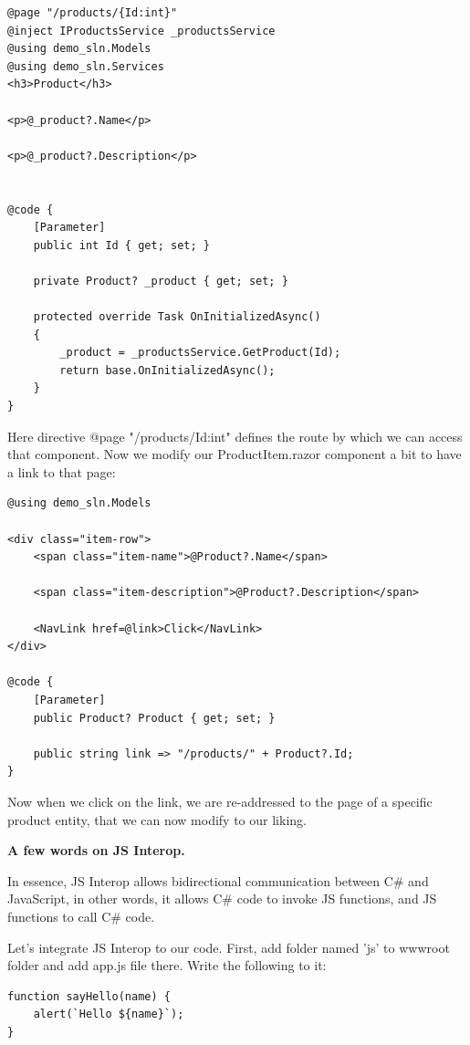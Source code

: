 \begin{lstlisting}
@page "/products/{Id:int}"
@inject IProductsService _productsService
@using demo_sln.Models
@using demo_sln.Services
<h3>Product</h3>

<p>@_product?.Name</p>

<p>@_product?.Description</p>


@code {
    [Parameter]
    public int Id { get; set; }

    private Product? _product { get; set; }

    protected override Task OnInitializedAsync()
    {
        _product = _productsService.GetProduct(Id);
        return base.OnInitializedAsync();
    }
}

\end{lstlisting}

Here directive @page "/products/{Id:int}" defines the route by which we can access that component.
Now we modify our ProductItem.razor component a bit to have a link to that page:

\begin{lstlisting}
@using demo_sln.Models

<div class="item-row">
    <span class="item-name">@Product?.Name</span>

    <span class="item-description">@Product?.Description</span>

    <NavLink href=@link>Click</NavLink>
</div>

@code {
    [Parameter]
    public Product? Product { get; set; }

    public string link => "/products/" + Product?.Id;
}
\end{lstlisting}

Now when we click on the link, we are re-addressed to the page of a specific product entity, that we can now modify to our liking.

\medskip

\textbf{A few words on JS Interop.}

In essence, JS Interop allows bidirectional communication between C\# and JavaScript, in other words, it allows C\# code to invoke JS functions, and JS functions to call C\# code.

Let's integrate JS Interop to our code. First, add folder named 'js' to wwwroot folder and add app.js file there. Write the following to it:

\begin{lstlisting}
function sayHello(name) {
    alert(`Hello ${name}`);
}
\end{lstlisting}


